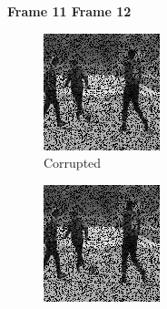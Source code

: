 \begin{figure}
  \centering
  \textbf{\hspace{0.2in} Frame 11 \hspace{1.5in} Frame 12\hspace{0.5in}\vspace{0.1in}}
  \begin{subfigure}{0.4\textwidth}
    \centering
    \includegraphics[width=.9\textwidth]{Chapter7/Images/soccer70_masked_11.png}
    \caption{Corrupted}
  \end{subfigure}
  \begin{subfigure}{0.4\textwidth}
    \centering
    \includegraphics[width=.9\textwidth]{Chapter7/Images/soccer70_masked_12.png}

\end{subfigure}
\end{figure}
